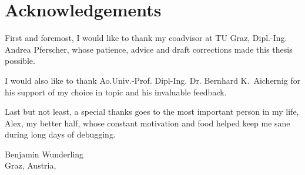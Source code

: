 %
%
%


\chapter*{Acknowledgements}

First and foremost, I would like to thank my coadvisor at TU Graz, Dipl.-Ing. Andrea Pferscher, whose patience, advice and draft corrections made this thesis possible. 

I would also like to thank Ao.Univ.-Prof. Dipl-Ing. Dr. Bernhard K.~Aichernig for his support of my choice in topic and his invaluable feedback.

Last but not least, a special thanks goes to the most important person in my life, Alex, my better half, whose constant motivation and food helped keep me sane during long days of debugging.


\vspace{2cm}


\begin{flushright}
Benjamin Wunderling \\[1ex]
{\small Graz, Austria, \thisdate}
\end{flushright}

